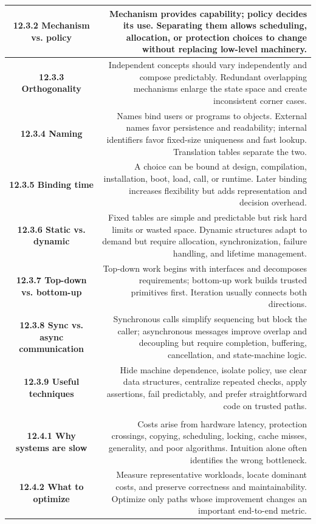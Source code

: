 \documentclass[10pt,letterpaper]{article}
\begin{document}
\begin{longtable}{C N}
\textbf{12.3.2 Mechanism vs. policy} & Mechanism provides capability; policy decides its use. Separating them allows scheduling, allocation, or protection choices to change without replacing low-level machinery.\\\hline
\textbf{12.3.3 Orthogonality} & Independent concepts should vary independently and compose predictably. Redundant overlapping mechanisms enlarge the state space and create inconsistent corner cases.\\\hline
\textbf{12.3.4 Naming} & Names bind users or programs to objects. External names favor persistence and readability; internal identifiers favor fixed-size uniqueness and fast lookup. Translation tables separate the two.\\\hline
\textbf{12.3.5 Binding time} & A choice can be bound at design, compilation, installation, boot, load, call, or runtime. Later binding increases flexibility but adds representation and decision overhead.\\\hline
\textbf{12.3.6 Static vs. dynamic} & Fixed tables are simple and predictable but risk hard limits or wasted space. Dynamic structures adapt to demand but require allocation, synchronization, failure handling, and lifetime management.\\\hline
\textbf{12.3.7 Top-down vs. bottom-up} & Top-down work begins with interfaces and decomposes requirements; bottom-up work builds trusted primitives first. Iteration usually connects both directions.\\\hline
\textbf{12.3.8 Sync vs. async communication} & Synchronous calls simplify sequencing but block the caller; asynchronous messages improve overlap and decoupling but require completion, buffering, cancellation, and state-machine logic.\\\hline
\textbf{12.3.9 Useful techniques} & Hide machine dependence, isolate policy, use clear data structures, centralize repeated checks, apply assertions, fail predictably, and prefer straightforward code on trusted paths.\\\hline
{}\\*\hline
\textbf{12.4.1 Why systems are slow} & Costs arise from hardware latency, protection crossings, copying, scheduling, locking, cache misses, generality, and poor algorithms. Intuition alone often identifies the wrong bottleneck.\\\hline
\textbf{12.4.2 What to optimize} & Measure representative workloads, locate dominant costs, and preserve correctness and maintainability. Optimize only paths whose improvement changes an important end-to-end metric.\\\hline

\end{longtable}
\end{document}
